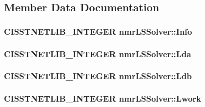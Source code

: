 \subsection{Member Data Documentation}
\hypertarget{classnmr_l_s_solver_a6d0d69c4ff841404a6be897dc17f41aa}{
\subsubsection[{Info}]{\setlength{\rightskip}{0pt plus 5cm}C\-I\-S\-S\-T\-N\-E\-T\-L\-I\-B\-\_\-\-I\-N\-T\-E\-G\-E\-R nmr\-L\-S\-Solver\-::\-Info\hspace{0.3cm}{\ttfamily [protected]}}}\label{classnmr_l_s_solver_a6d0d69c4ff841404a6be897dc17f41aa}
\hypertarget{classnmr_l_s_solver_a91f013fd3848b399838934e9944a8b03}{
\subsubsection[{Lda}]{\setlength{\rightskip}{0pt plus 5cm}C\-I\-S\-S\-T\-N\-E\-T\-L\-I\-B\-\_\-\-I\-N\-T\-E\-G\-E\-R nmr\-L\-S\-Solver\-::\-Lda\hspace{0.3cm}{\ttfamily [protected]}}}\label{classnmr_l_s_solver_a91f013fd3848b399838934e9944a8b03}
\hypertarget{classnmr_l_s_solver_a18e45725c1e373bccc3201e20a483fcb}{
\subsubsection[{Ldb}]{\setlength{\rightskip}{0pt plus 5cm}C\-I\-S\-S\-T\-N\-E\-T\-L\-I\-B\-\_\-\-I\-N\-T\-E\-G\-E\-R nmr\-L\-S\-Solver\-::\-Ldb\hspace{0.3cm}{\ttfamily [protected]}}}\label{classnmr_l_s_solver_a18e45725c1e373bccc3201e20a483fcb}
\hypertarget{classnmr_l_s_solver_a495b9cb5c8c3b62b1d12a0ba6f4e1690}{
\subsubsection[{Lwork}]{\setlength{\rightskip}{0pt plus 5cm}C\-I\-S\-S\-T\-N\-E\-T\-L\-I\-B\-\_\-\-I\-N\-T\-E\-G\-E\-R nmr\-L\-S\-Solver\-::\-Lwork\hspace{0.3cm}{\ttfamily [protected]}}}\label{classnmr_l_s_solver_a495b9cb5c8c3b62b1d12a0ba6f4e1690}
